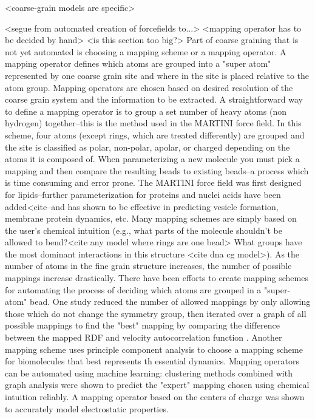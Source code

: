 <coarse-grain models are specific>

<segue from automated creation of forcefields to...>
<mapping operator has to be decided by hand> <is this section too big?>
Part of coarse graining that is not yet automated is choosing a mapping scheme or a mapping operator.
A mapping operator defines which atoms are grouped into a "super atom" represented by one coarse grain site and where in the site is placed relative to the atom group.
Mapping operators are chosen based on desired resolution of the coarse grain system and the information to be extracted.
A straightforward way to define a mapping operator is to group a set number of heavy atoms (non hydrogen) together--this is the method used in the MARTINI force field\cite{Marrink2007}.
In this scheme, four atoms (except rings, which are treated differently) are grouped and the site is classified as polar, non-polar, apolar, or charged depending on the atoms it is composed of.
When parameterizing a new molecule you must pick a mapping and then compare the resulting beads to existing beads--a process which is time consuming and error prone\cite{http://www.cgmartini.nl/index.php/tutorials-general-introduction-gmx5/parametrzining-new-molecule-gmx5}.
The MARTINI force field was first designed for lipids--further parameterization for proteins and nuclei acids have been added<cite--and has shown to be effective in predicting vesicle formation, membrane protein dynamics, etc.
Many mapping schemes are simply based on the user's chemical intuition (e.g., what parts of the molecule shouldn't be allowed to bend?<cite any model where rings are one bead> What groups have the most dominant interactions in this structure <cite dna cg model>).
As the number of atoms in the fine grain structure increases, the number of possible mappings increase drastically.
There have been efforts to create mapping schemes for automating the process of deciding which atoms are grouped in a "super-atom" bead.
One study reduced the number of allowed mappings by only allowing those which do not change the symmetry group, then iterated over a graph of all possible mappings to find the "best" mapping by comparing the difference between the mapped RDF and velocity autocorrelation function \cite{Chakraborty2018a}.
Another mapping scheme uses principle component analysis to choose a mapping scheme for biomolecules that best represents th essential dynamics\cite{Zhang2008}.
Mapping operators can be automated using machine learning: clustering methods combined with graph analysis were shown to predict the "expert" mapping chosen using chemical intuition reliably\cite{li2020}. 
A mapping operator based on the centers of charge was shown to accurately model electrostatic properties\cite{Cao2015a}.


